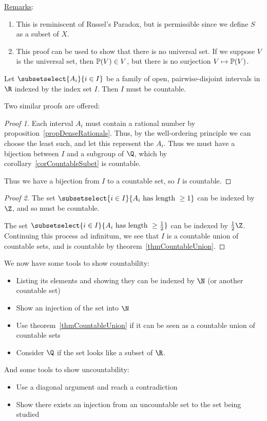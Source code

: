 \documentclass[../Main.tex]{subfiles}
\begin{document}
\underline{Remarks}:
\begin{enumerate}
    \item This is reminiscent of Russel's Paradox, but is permissible since we define $S$ as a subset of $X$.
    \item This proof can be used to show that there is no universal set. If we suppose $V$ is the universal set, then $\mathbb{P}(V) \in V$, but there is no surjection $V \mapsto \mathbb{P}(V)$.
\end{enumerate}
\begin{lemma}
    Let $\subsetselect{A_i}{i \in I}$ be a family of open, pairwise-disjoint intervals in $\R$ indexed by the index set $I$. Then $I$ must be countable.
\end{lemma}
Two similar proofs are offered:
\begin{proof}[Proof 1]
    Each interval $A_i$ must contain a rational number by proposition~\ref{propDenseRationals}. Thus, by the well-ordering principle we can choose the least such, and let this represent the $A_i$. Thus we must have a bijection between $I$ and a subgroup of $\Q$, which by corollary~\ref{corCountableSubet} is countable.\par
    Thus we have a bijection from $I$ to a countable set, so $I$ is countable.
\end{proof}
\begin{proof}[Proof 2]
    The set $\subsetselect{i \in I}{A_i \text{ has length } \geq 1}$ can be indexed by $\Z$, and so must be countable.\par
    The set $\subsetselect{i \in I}{A_i \text{ has length } \geq \frac{1}{2}}$ can be indexed by $\frac{1}{2}\Z$. Continuing this process ad infinitum, we see that $I$ is a countable union of countable sets, and is countable by theorem~\ref{thmCountableUnion}.
\end{proof}
We now have some tools to show countability:
\begin{itemize}
    \item Listing its elements and showing they can be indexed by $\N$ (or another countable set)
    \item Show an injection of the set into $\N$
    \item Use theorem~\ref{thmCountableUnion} if it can be seen as a countable union of countable sets
    \item Consider $\Q$ if the set looks like a subset of $\R$.
\end{itemize}
And some tools to show uncountability:
\begin{itemize}
    \item Use a diagonal argument and reach a contradiction
    \item Show there exists an injection from an uncountable set to the set being studied
\end{itemize}
\end{document}
